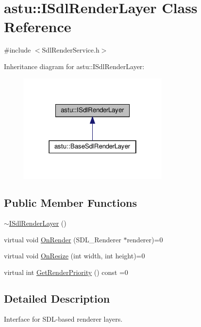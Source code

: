 \hypertarget{classastu_1_1ISdlRenderLayer}{}\section{astu\+:\+:I\+Sdl\+Render\+Layer Class Reference}
\label{classastu_1_1ISdlRenderLayer}


{\ttfamily \#include $<$Sdl\+Render\+Service.\+h$>$}



Inheritance diagram for astu\+:\+:I\+Sdl\+Render\+Layer\+:\nopagebreak
\begin{figure}[H]
\begin{center}
\leavevmode
\includegraphics[width=214pt]{classastu_1_1ISdlRenderLayer__inherit__graph}
\end{center}
\end{figure}
\subsection*{Public Member Functions}
\begin{DoxyCompactItemize}
\item 
\hyperlink{classastu_1_1ISdlRenderLayer_af507055c193d430822d5aadb6cbaf6a9}{$\sim$\+I\+Sdl\+Render\+Layer} ()
\item 
virtual void \hyperlink{classastu_1_1ISdlRenderLayer_a18af53e17e7f6f945817ad3e8b8ecc87}{On\+Render} (S\+D\+L\+\_\+\+Renderer $\ast$renderer)=0
\item 
virtual void \hyperlink{classastu_1_1ISdlRenderLayer_abcded808a2405e1e59413b5d1f981f13}{On\+Resize} (int width, int height)=0
\item 
virtual int \hyperlink{classastu_1_1ISdlRenderLayer_a623b411a1afa967bdaa879f5075eec43}{Get\+Render\+Priority} () const =0
\end{DoxyCompactItemize}


\subsection{Detailed Description}
Interface for S\+D\+L-\/based renderer layers.

